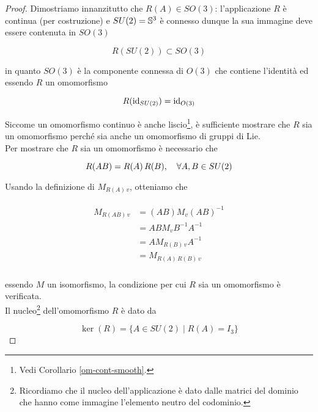 \begin{proof}
	Dimostriamo innanzitutto che $ R(A) \in SO(3) $: l'applicazione $ R $ è continua (per costruzione) e $ SU(2) = \S^{3} $ è connesso dunque la sua immagine deve essere contenuta in $ SO(3) $
	
	\begin{equation}
		R(SU(2)) \subset SO(3)
	\end{equation}
	
	in quanto $ SO(3) $ è la componente connessa di $ O(3) $ che contiene l'identità ed essendo $ R $ un omomorfismo
	
	\begin{equation}
		R(\id_{SU(2)}) = \id_{O(3)}
	\end{equation}

	Siccome un omomorfismo continuo è anche liscio\footnote{%
		Vedi Corollario \ref{om-cont-smooth}.%
	}, è sufficiente mostrare che $ R $ sia un omomorfismo perché sia anche un omomorfismo di gruppi di Lie.\\
	Per mostrare che $ R $ sia un omomorfismo è necessario che
	
	\begin{equation}
		R(A B) = R(A) \, R(B) \qcomma \forall A,B \in SU(2)
	\end{equation}

	Usando la definizione di $ M_{R(A) \, v} $, otteniamo che
	
	\begin{align}
		\begin{split}
			M_{R(A B) \, v} &= (A B) M_{v} (A B)^{-1}\\
			&= A B M_{v} B^{-1} A^{-1}\\
			&= A M_{R(B) \, v} A^{-1}\\
			&= M_{R(A) \, R(B) \, v}\\
		\end{split}
	\end{align}

	essendo $ M $ un isomorfismo, la condizione per cui $ R $ sia un omomorfismo è verificata.\\
	Il nucleo\footnote{%
		Ricordiamo che il nucleo dell'applicazione è dato dalle matrici del dominio che hanno come immagine l'elemento neutro del codominio.%
	} dell'omomorfismo $ R $ è dato da
	
	\begin{equation}
		\ker(R) = \{ A \in SU(2) \mid R(A) = I_{3} \}
	\end{equation}


\end{proof}

